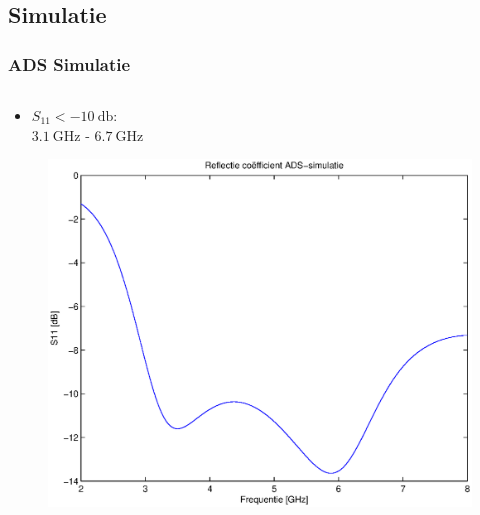 \documentclass{beamer}
\begin{document}
\subsection{Simulatie}
  \begin{frame}
  \frametitle{ADS Simulatie}
    \begin{columns}[c]
      \begin{column}{0.5\textwidth}
      \begin{itemize}
        \item $S_{11} < \SI{-10}{\decibel}$: \\ $\SI{3.1}{\giga\hertz}$ - $\SI{6.7}{\giga\hertz}$
      \end{itemize}
        \begin{figure}
          \includegraphics[width=\textwidth]{images/S11_ADS_sim.eps}
        \end{figure}

      \end{column}


\end{columns}
\end{frame}
\end{document}
